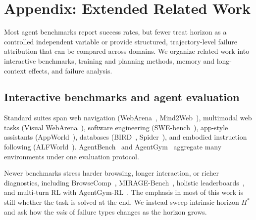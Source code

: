 \documentclass[11pt]{article}
\begin{document}
%



\appendix


\clearpage
\section{Appendix: Extended Related Work} \label{app:extended_rw}

Most agent benchmarks report success rates, but fewer treat horizon as a controlled independent variable or provide structured, trajectory-level failure attribution that can be compared across domains. We organize related work into interactive benchmarks, training and planning methods, memory and long-context effects, and failure analysis.

\subsection{Interactive benchmarks and agent evaluation}

Standard suites span web navigation (WebArena~\citep{zhou2023webarena}, Mind2Web~\citep{deng2023mind2web}), multimodal web tasks (Visual WebArena~\citep{koh2024visualwebarena}), software engineering (SWE-bench~\citep{jimenez2023swe}), app-style assistants (AppWorld~\citep{trivedi2024appworld}), databases (BIRD~\citep{li2023bird}, Spider~\citep{yu2018spider}), and embodied instruction following (ALFWorld~\citep{shridhar2020alfworld}). AgentBench~\citep{liu2023agentbench} and AgentGym~\citep{xi2023agentgym} aggregate many environments under one evaluation protocol.

Newer benchmarks stress harder browsing, longer interaction, or richer diagnostics, including BrowseComp~\citep{wei2025browsecomp}, MIRAGE-Bench~\citep{zhang2025mirage}, holistic leaderboards~\citep{kapoor2025holistic}, and multi-turn RL with AgentGym-RL~\citep{xi2025agentgym}. The emphasis in most of this work is still whether the task is solved at the end. We instead sweep intrinsic horizon \(H^*\) and ask how the \emph{mix} of failure types changes as the horizon grows.
\end{document}
